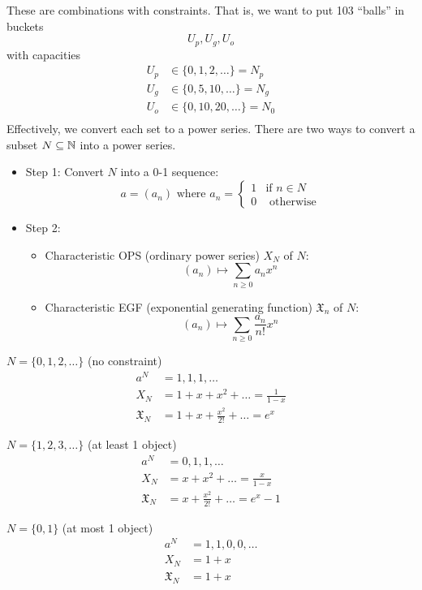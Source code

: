 \documentclass[12pt]{article}
\begin{document}
These are combinations with constraints. That is, we want to put 103 ``balls'' in buckets \[U_{p}, U_{g}, U_{o}\] with capacities \begin{align*}
    U_p&\in \{0,1,2,\dots\} = N_p\\
    U_g&\in \{0,5,10,\dots\}= N_g\\
    U_o&\in \{0,10,20,\dots\}= N_0\\
\end{align*}
Effectively, we convert each set to a power series. There are two ways to convert a subset $N\subseteq\mathbb{N}$ into a power series. \begin{itemize}
    \item Step 1: Convert $N$ into a 0-1 sequence: \[a=(a_n) \text{ where }a_n=\begin{cases}
        1 & \text{if }n\in N\\
        0 & \text{ otherwise}
    \end{cases}\]
    \item Step 2: \begin{itemize}
        \item Characteristic OPS (ordinary power series) $X_N$ of $N$: \[(a_n)\mapsto \sum_{n\geq 0 }a_nx^n\]
        \item Characteristic EGF (exponential generating function) $\mathfrak{X}_n$ of $N$: \[(a_n)\mapsto \sum_{n\geq 0}\frac{a_n}{n!}x^n\]
    \end{itemize}
\end{itemize}

\eg $N=\{0,1,2,\dots\}$ \hfill(no constraint)\begin{align*}
    a^N &= 1,1,1,\dots\\
    X_N &= 1+x+x^2 +\dots = \frac{1}{1-x}\\
    \mathfrak{X}_N &= 1+x+\frac{x^2}{2!}+\dots = e^x
\end{align*}

\eg $N=\{1,2,3,\dots\}$ \hfill(at least 1 object)\begin{align*}
    a^N &= 0,1,1,\dots\\
    X_N &= x+x^2 +\dots = \frac{x}{1-x}\\
    \mathfrak{X}_N &= x+\frac{x^2}{2!}+\dots = e^x-1
\end{align*}

\eg $N=\{0,1\}$ \hfill(at most 1 object)\begin{align*}
    a^N &= 1,1,0,0,\dots\\
    X_N &= 1+x\\
    \mathfrak{X}_N &= 1+x
\end{align*}
\end{document}
